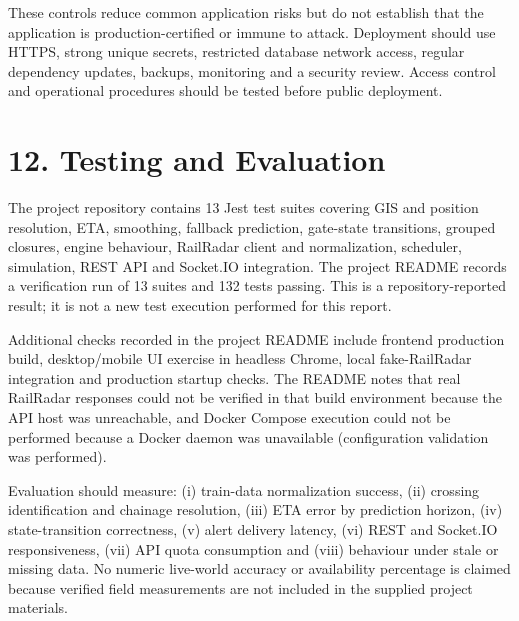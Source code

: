 \documentclass[12pt,a4paper]{report}
\begin{document}
These controls reduce common application risks but do not establish that the application is production-certified or immune to attack. Deployment should use HTTPS, strong unique secrets, restricted database network access, regular dependency updates, backups, monitoring and a security review. Access control and operational procedures should be tested before public deployment.

\chapter{12. Testing and Evaluation}
The project repository contains 13 Jest test suites covering GIS and position resolution, ETA, smoothing, fallback prediction, gate-state transitions, grouped closures, engine behaviour, RailRadar client and normalization, scheduler, simulation, REST API and Socket.IO integration. The project README records a verification run of 13 suites and 132 tests passing. This is a repository-reported result; it is not a new test execution performed for this report.

Additional checks recorded in the project README include frontend production build, desktop/mobile UI exercise in headless Chrome, local fake-RailRadar integration and production startup checks. The README notes that real RailRadar responses could not be verified in that build environment because the API host was unreachable, and Docker Compose execution could not be performed because a Docker daemon was unavailable (configuration validation was performed).

Evaluation should measure: (i) train-data normalization success, (ii) crossing identification and chainage resolution, (iii) ETA error by prediction horizon, (iv) state-transition correctness, (v) alert delivery latency, (vi) REST and Socket.IO responsiveness, (vii) API quota consumption and (viii) behaviour under stale or missing data. No numeric live-world accuracy or availability percentage is claimed because verified field measurements are not included in the supplied project materials.
\end{document}

